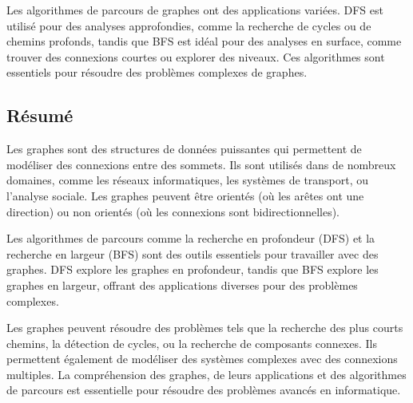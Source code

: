 Les algorithmes de parcours de graphes ont des applications variées. DFS est utilisé pour des analyses approfondies, comme la recherche de cycles ou de chemins profonds, tandis que BFS est idéal pour des analyses en surface, comme trouver des connexions courtes ou explorer des niveaux. Ces algorithmes sont essentiels pour résoudre des problèmes complexes de graphes.


\subsection{Résumé}

Les graphes sont des structures de données puissantes qui permettent de modéliser des connexions entre des sommets. Ils sont utilisés dans de nombreux domaines, comme les réseaux informatiques, les systèmes de transport, ou l'analyse sociale. Les graphes peuvent être orientés (où les arêtes ont une direction) ou non orientés (où les connexions sont bidirectionnelles).

Les algorithmes de parcours comme la recherche en profondeur (DFS) et la recherche en largeur (BFS) sont des outils essentiels pour travailler avec des graphes. DFS explore les graphes en profondeur, tandis que BFS explore les graphes en largeur, offrant des applications diverses pour des problèmes complexes.

Les graphes peuvent résoudre des problèmes tels que la recherche des plus courts chemins, la détection de cycles, ou la recherche de composants connexes. Ils permettent également de modéliser des systèmes complexes avec des connexions multiples. La compréhension des graphes, de leurs applications et des algorithmes de parcours est essentielle pour résoudre des problèmes avancés en informatique.

